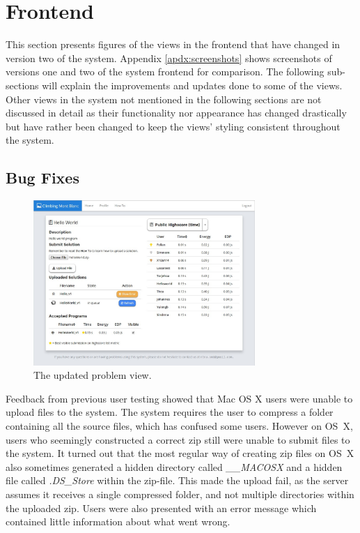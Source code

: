 \section{Frontend}
\label{sec:impr-frontend}
This section presents figures of the views in the frontend that have changed in version two of the system. Appendix \ref{apdx:screenshots} shows screenshots of versions one and two of the system frontend for comparison. The following sub-sections will explain the improvements and updates done to some of the views. Other views in the system not mentioned in the following sections are not discussed in detail as their functionality nor appearance has changed drastically but have rather been changed to keep the views’ styling consistent throughout the system.

\subsection{Bug Fixes}
\label{sub-sec:impr-frontend-bug}
\begin{figure}[b!]
    \centering
    \includegraphics[width=0.75\textwidth]{figs/new_problem.jpg}
    \caption[The updated problem view]{The updated problem view.}
    \label{fig:new-problem}
\end{figure}
Feedback from previous user testing showed that Mac OS X users were unable to upload files to the system. The system requires the user to compress a folder containing all the source files, which has confused some users. However on OS~X, users who seemingly constructed a correct zip still were unable to submit files to the system. It turned out that the most regular way of creating zip files on OS~X also sometimes generated a hidden directory called \textit{\_\_MACOSX} and a hidden file called \textit{.DS\_Store} within the zip-file. This made the upload fail, as the server assumes it receives a single compressed folder, and not multiple directories within the uploaded zip. Users were also presented with an error message which contained little information about what went wrong. \\

